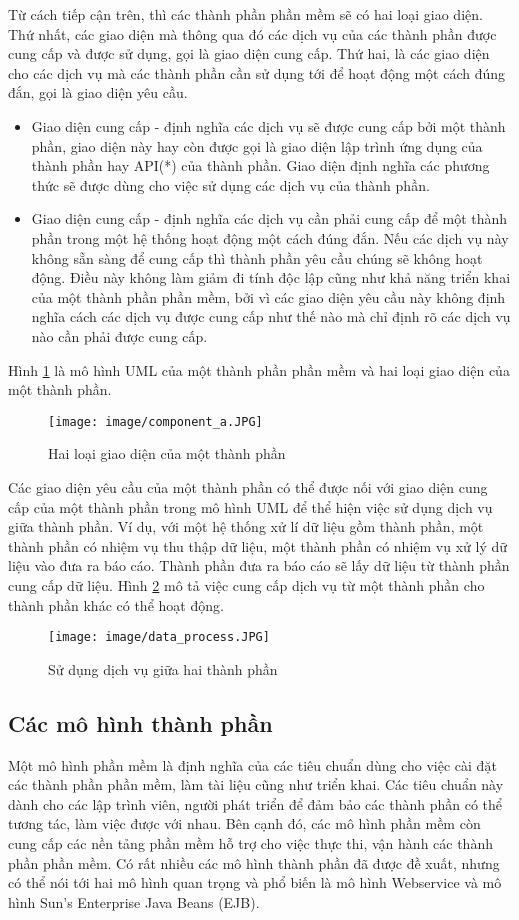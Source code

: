 Từ cách tiếp cận trên, thì các thành phần phần mềm sẽ có hai loại giao diện. Thứ nhất, các giao diện mà thông qua đó các dịch vụ của các thành phần được cung cấp và được sử dụng, gọi là giao diện cung cấp. Thứ hai, là các giao diện cho các dịch vụ mà các thành phần cần sử dụng tới để hoạt động một cách đúng đắn, gọi là giao diện yêu cầu.

\begin{itemize}
  \item Giao diện cung cấp - định nghĩa các dịch vụ sẽ được cung cấp bởi một thành phần, giao diện này hay còn được gọi là giao diện lập trình ứng dụng của thành phần hay API(*) của thành phần. Giao diện định nghĩa các phương thức sẽ được dùng cho việc sử dụng các dịch vụ của thành phần.
  \item Giao diện cung cấp - định nghĩa các dịch vụ cần phải cung cấp để một thành phần trong một hệ thống hoạt động một cách đúng đắn. Nếu các dịch vụ này không sẵn sàng để cung cấp thì thành phần yêu cầu chúng sẽ không hoạt động. Điều này không làm giảm đi tính độc lập cũng như khả năng triển khai của một thành phần phần mềm, bởi vì các giao diện yêu cầu này không định nghĩa cách các dịch vụ được cung cấp như thế nào mà chỉ định rõ các dịch vụ nào cần phải được cung cấp.
\end{itemize}
Hình \ref{fig:component_a} là mô hình UML của một thành phần phần mềm và hai loại giao diện của một thành phần.
	\begin{figure}[bp]
		\centering
			\texttt{[image: image/component\_a.JPG]}
		\caption{Hai loại giao diện của một thành phần}
		\label{fig:component_a}
	\end{figure}
	
Các giao diện yêu cầu của một thành phần có thể được nối với giao diện cung cấp của một thành phần trong mô hình UML để thể hiện việc sử dụng dịch vụ giữa thành phần. Ví dụ, với một hệ thống xử lí dữ liệu gồm thành phần, một thành phần có nhiệm vụ thu thập dữ liệu, một thành phần có nhiệm vụ xử lý dữ liệu vào đưa ra báo cáo. Thành phần đưa ra báo cáo sẽ lấy dữ liệu từ thành phần cung cấp dữ liệu. Hình \ref{fig:data_process} mô tả việc cung cấp dịch vụ từ một thành phần cho thành phần khác có thể hoạt động.

\begin{figure}
	\centering
		\texttt{[image: image/data\_process.JPG]}
	\caption{Sử dụng dịch vụ giữa hai thành phần}
	\label{fig:data_process}
\end{figure}


\subsection{Các mô hình thành phần}
Một mô hình phần mềm là định nghĩa của các tiêu chuẩn dùng cho việc cài đặt các thành phần phần mềm, làm tài liệu cũng như triển khai. Các tiêu chuẩn này dành cho các lập trình viên, người phát triển để đảm bảo các thành phần có thể tương tác, làm việc được với nhau. Bên cạnh đó, các mô hình phần mềm còn cung cấp các nền tảng phần mềm hỗ trợ cho việc thực thi, vận hành các thành phần phần mềm. Có rất nhiều các mô hình thành phần đã được đề xuất, nhưng có thể nói tới hai mô hình quan trọng và phổ biến là mô hình Webservice và mô hình Sun’s  Enterprise  Java  Beans  (EJB).

